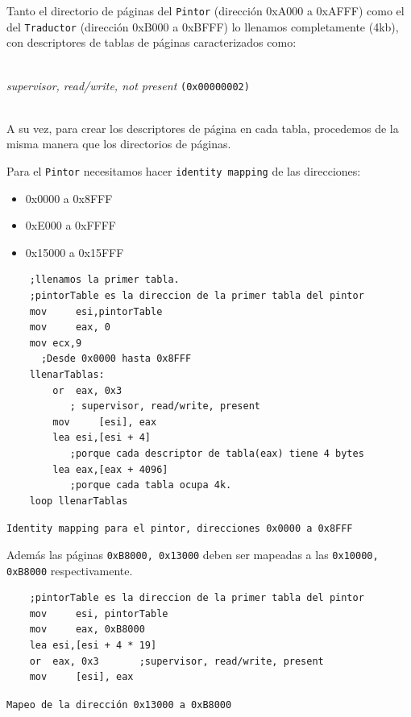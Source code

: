 \documentclass[a4paper, 10pt]{article}
\begin{document}
\vspace*{2em}

Tanto el directorio de p\'aginas del \texttt{Pintor} (direcci\'on 0xA000 a 0xAFFF) como el del \texttt{Traductor} (direcci\'on 0xB000 a 0xBFFF) lo llenamos completamente (4kb), con descriptores de tablas de p\'aginas caracterizados como: \\ \\
\centerline{\textit{ supervisor, read/write, not present} \texttt{(0x00000002)}} \\

A su vez, para crear los descriptores de p\'agina en cada tabla, procedemos de la misma manera que los directorios de p\'aginas.

Para el \texttt{Pintor} necesitamos hacer \texttt{identity mapping} de las direcciones:
\begin{itemize}
	\item 0x0000  a 0x8FFF
	\item 0xE000  a 0xFFFF
	\item 0x15000 a 0x15FFF
\end{itemize}

\lstset{language=[x86masm]Assembler}
\begin{lstlisting}
	;llenamos la primer tabla.
	;pintorTable es la direccion de la primer tabla del pintor
	mov 	esi,pintorTable		
	mov 	eax, 0
	mov ecx,9 						
	  ;Desde 0x0000 hasta 0x8FFF
	llenarTablas:
		or 	eax, 0x3				
		   ; supervisor, read/write, present
		mov 	[esi], eax
		lea esi,[esi + 4]			
		   ;porque cada descriptor de tabla(eax) tiene 4 bytes
		lea eax,[eax + 4096]	   
		   ;porque cada tabla ocupa 4k.
	loop llenarTablas
\end{lstlisting}
\texttt{Identity mapping para el pintor, direcciones 0x0000 a 0x8FFF} \\ 

\newpage

Adem\'as las p\'aginas \texttt{0xB8000, 0x13000} deben ser mapeadas a las \texttt{0x10000, 0xB8000} respectivamente.

\lstset{language=[x86masm]Assembler}
\begin{lstlisting}
	;pintorTable es la direccion de la primer tabla del pintor
	mov 	esi, pintorTable	
	mov 	eax, 0xB8000
	lea esi,[esi + 4 * 19]		
	or 	eax, 0x3	   ;supervisor, read/write, present
	mov 	[esi], eax
\end{lstlisting}
\texttt{Mapeo de la direcci\'on 0x13000 a 0xB8000} \\ 
\end{document}
